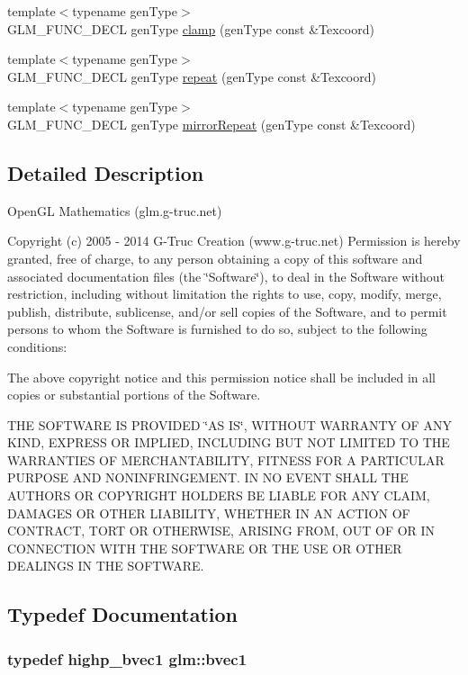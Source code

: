 \begin{CompactItemize}
\item 
{\footnotesize template$<$typename genType$>$ }\\GLM\_\-FUNC\_\-DECL genType \hyperlink{group__gtx__wrap_g18e81aeb796ba941505bb883f1efd586}{clamp} (genType const \&Texcoord)
\item 
{\footnotesize template$<$typename genType$>$ }\\GLM\_\-FUNC\_\-DECL genType \hyperlink{group__gtx__wrap_g0e136d75883428ad7d9c19611290d77a}{repeat} (genType const \&Texcoord)
\item 
{\footnotesize template$<$typename genType$>$ }\\GLM\_\-FUNC\_\-DECL genType \hyperlink{group__gtx__wrap_g03ce460f4f1bbc3058ce0d4928e29071}{mirrorRepeat} (genType const \&Texcoord)
\end{CompactItemize}


\subsection{Detailed Description}
OpenGL Mathematics (glm.g-truc.net)

Copyright (c) 2005 - 2014 G-Truc Creation (www.g-truc.net) Permission is hereby granted, free of charge, to any person obtaining a copy of this software and associated documentation files (the \char`\"{}Software\char`\"{}), to deal in the Software without restriction, including without limitation the rights to use, copy, modify, merge, publish, distribute, sublicense, and/or sell copies of the Software, and to permit persons to whom the Software is furnished to do so, subject to the following conditions:

The above copyright notice and this permission notice shall be included in all copies or substantial portions of the Software.

THE SOFTWARE IS PROVIDED \char`\"{}AS IS\char`\"{}, WITHOUT WARRANTY OF ANY KIND, EXPRESS OR IMPLIED, INCLUDING BUT NOT LIMITED TO THE WARRANTIES OF MERCHANTABILITY, FITNESS FOR A PARTICULAR PURPOSE AND NONINFRINGEMENT. IN NO EVENT SHALL THE AUTHORS OR COPYRIGHT HOLDERS BE LIABLE FOR ANY CLAIM, DAMAGES OR OTHER LIABILITY, WHETHER IN AN ACTION OF CONTRACT, TORT OR OTHERWISE, ARISING FROM, OUT OF OR IN CONNECTION WITH THE SOFTWARE OR THE USE OR OTHER DEALINGS IN THE SOFTWARE. 

\subsection{Typedef Documentation}
\hypertarget{namespaceglm_30260c045e085bb8d19eddca772cac61}{
\subsubsection[bvec1]{\setlength{\rightskip}{0pt plus 5cm}typedef {\bf highp\_\-bvec1} {\bf glm::bvec1}}}
\label{namespaceglm_30260c045e085bb8d19eddca772cac61}


